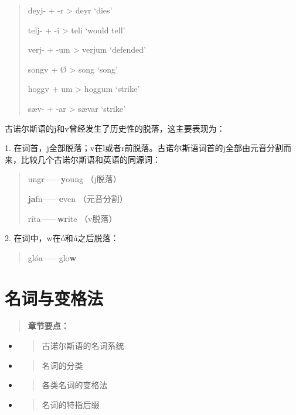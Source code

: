 \begin{quote}
deyj- + -r \textgreater{} deyr `dies'

telj- + -i \textgreater{} teli `would tell'

verj- + -um \textgreater{} verjum `defended'

songv + Ø \textgreater{} song `song'

hoggv + um \textgreater{} hoggum `strike'

sæv- + -ar \textgreater{} sævar `strike'
\end{quote}

古诺尔斯语的j和v曾经发生了历史性的脱落，这主要表现为：

1.
在词首，j全部脱落；v在l或者r前脱落。古诺尔斯语词首的j全部由元音分割而来，比较几个古诺尔斯语和英语的同源词：

\begin{quote}
ungr------\textbf{y}oung （j脱落）

\textbf{ja}fn------\textbf{e}ven （元音分割）

ríta------\textbf{wr}ite （v脱落）
\end{quote}

2. 在词中，w在ó和ú之后脱落：

\begin{quote}
glóa------glo\textbf{w}
\end{quote}

\section{名词与变格法}\label{名词与变格法}

\begin{quote}
\textbf{章节要点：}
\end{quote}

\begin{itemize}
\item
  \begin{quote}
  古诺尔斯语的名词系统
  \end{quote}
\item
  \begin{quote}
  名词的分类
  \end{quote}
\item
  \begin{quote}
  各类名词的变格法
  \end{quote}
\item
  \begin{quote}
  名词的特指后缀
  \end{quote}
\end{itemize}

